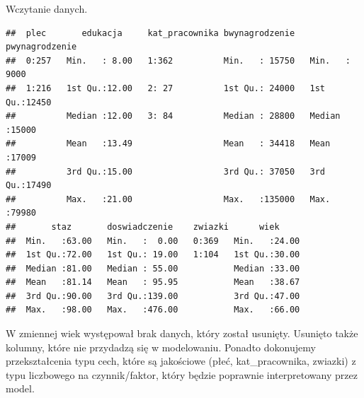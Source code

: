 \documentclass[]{book}
\newenvironment{Shaded}{\begin{snugshade}}{\end{snugshade}}
\newcommand{\DataTypeTok}[1]{\textcolor[rgb]{0.13,0.29,0.53}{#1}}
\newcommand{\KeywordTok}[1]{\textcolor[rgb]{0.13,0.29,0.53}{\textbf{#1}}}
\newcommand{\NormalTok}[1]{#1}
\newcommand{\OperatorTok}[1]{\textcolor[rgb]{0.81,0.36,0.00}{\textbf{#1}}}
\newcommand{\StringTok}[1]{\textcolor[rgb]{0.31,0.60,0.02}{#1}}
\begin{document}
Wczytanie danych.

\begin{Shaded}
\end{Shaded}

\begin{verbatim}
##  plec       edukacja     kat_pracownika bwynagrodzenie   pwynagrodzenie 
##  0:257   Min.   : 8.00   1:362          Min.   : 15750   Min.   : 9000  
##  1:216   1st Qu.:12.00   2: 27          1st Qu.: 24000   1st Qu.:12450  
##          Median :12.00   3: 84          Median : 28800   Median :15000  
##          Mean   :13.49                  Mean   : 34418   Mean   :17009  
##          3rd Qu.:15.00                  3rd Qu.: 37050   3rd Qu.:17490  
##          Max.   :21.00                  Max.   :135000   Max.   :79980  
##       staz       doswiadczenie    zwiazki      wiek      
##  Min.   :63.00   Min.   :  0.00   0:369   Min.   :24.00  
##  1st Qu.:72.00   1st Qu.: 19.00   1:104   1st Qu.:30.00  
##  Median :81.00   Median : 55.00           Median :33.00  
##  Mean   :81.14   Mean   : 95.95           Mean   :38.67  
##  3rd Qu.:90.00   3rd Qu.:139.00           3rd Qu.:47.00  
##  Max.   :98.00   Max.   :476.00           Max.   :66.00
\end{verbatim}

W zmiennej wiek występował brak danych, który został usunięty. Usunięto także kolumny, które nie przydadzą się w modelowaniu. Ponadto dokonujemy przekształcenia typu cech, które są jakościowe (płeć, kat\_pracownika, zwiazki) z typu liczbowego na czynnik/faktor, który będzie poprawnie interpretowany przez model.
\end{document}
